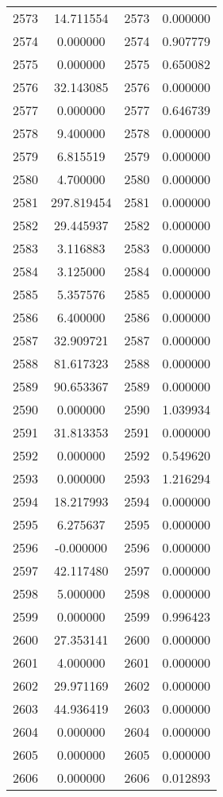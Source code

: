 \documentclass[12pt]{article}
\begin{document}
\begin{longtable}{@{}cccc@{}}
2573 & 14.711554 & 2573 & 0.000000 \\
2574 & 0.000000 & 2574 & 0.907779 \\
2575 & 0.000000 & 2575 & 0.650082 \\
2576 & 32.143085 & 2576 & 0.000000 \\
2577 & 0.000000 & 2577 & 0.646739 \\
2578 & 9.400000 & 2578 & 0.000000 \\
2579 & 6.815519 & 2579 & 0.000000 \\
2580 & 4.700000 & 2580 & 0.000000 \\
2581 & 297.819454 & 2581 & 0.000000 \\
2582 & 29.445937 & 2582 & 0.000000 \\
2583 & 3.116883 & 2583 & 0.000000 \\
2584 & 3.125000 & 2584 & 0.000000 \\
2585 & 5.357576 & 2585 & 0.000000 \\
2586 & 6.400000 & 2586 & 0.000000 \\
2587 & 32.909721 & 2587 & 0.000000 \\
2588 & 81.617323 & 2588 & 0.000000 \\
2589 & 90.653367 & 2589 & 0.000000 \\
2590 & 0.000000 & 2590 & 1.039934 \\
2591 & 31.813353 & 2591 & 0.000000 \\
2592 & 0.000000 & 2592 & 0.549620 \\
2593 & 0.000000 & 2593 & 1.216294 \\
2594 & 18.217993 & 2594 & 0.000000 \\
2595 & 6.275637 & 2595 & 0.000000 \\
2596 & -0.000000 & 2596 & 0.000000 \\
2597 & 42.117480 & 2597 & 0.000000 \\
2598 & 5.000000 & 2598 & 0.000000 \\
2599 & 0.000000 & 2599 & 0.996423 \\
2600 & 27.353141 & 2600 & 0.000000 \\
2601 & 4.000000 & 2601 & 0.000000 \\
2602 & 29.971169 & 2602 & 0.000000 \\
2603 & 44.936419 & 2603 & 0.000000 \\
2604 & 0.000000 & 2604 & 0.000000 \\
2605 & 0.000000 & 2605 & 0.000000 \\
2606 & 0.000000 & 2606 & 0.012893 \\

\end{longtable}
\end{document}

